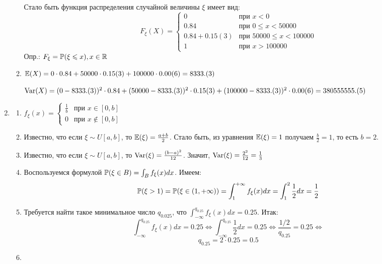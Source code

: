 \documentclass[12pt, a4paper]{article}\usepackage[]{graphicx}\usepackage[]{color}
\begin{document}
\begin{enumerate}
\begin{enumerate}
								Стало быть функция распределения случайной величины $\xi$ имеет вид:
								\[
								F_{\xi} (X) =
								\begin{cases}
								0 & \text{при } x<0 \\
								0.84 & \text{при } 0 \leq x < 50000 \\
								0.84 + 0.15(3) & \text{при } 50000
								\leq x < 100000 \\
								1 & \text{при } x > 100000
								\end{cases}
								\]
								Опр.: $F_{\xi} = \P (\xi \leq x ), x \in \mathbb{R}$
								\item $\E (X) = 0 \cdot 0.84 + 50000 \cdot 0.15(3) + 100000 \cdot 0.00(6) = 8333.(3)	$

								$\Var(X) = (0 - 8333.(3))^2 \cdot 0.84 + (50000-8333.(3))^2 \cdot 0.15(3) + (100000 - 8333.(3))^2 \cdot 0.00(6) = 380555555.(5)$
							\end{enumerate}
							\item
							\begin{enumerate}
								\item $ f_{\xi} (x)=
								\begin{cases}
								\frac{1}{b} & \text{при } x \in [0, b] \\
								0 & \text{при } x \notin [0, b]
								\end{cases}
								$
								\item  Известно, что если $\xi \sim U[a, b]$, то $\E (\xi) = \frac{a+b}{2}$. Стало быть, из уравнения $\E (\xi) = 1$ получаем $\frac{b}{2} = 1$,  то есть $b=2$.
								\item Известно, что если $\xi \sim U[a, b]$, то $\Var (\xi) = \frac{(b-a)^2}{12}$. Значит, $\Var (\xi) = \frac{2^2}{12} = \frac{1}{3}$
								\item Воспользуемся формулой $\P (\xi \in B ) = \int_B f_{\xi} (x) dx$. Имеем:
								\[
								\P (\xi > 1 ) = \P (\xi \in (1, + \infty) ) = \int_{1}^{+ \infty} f_{\xi} (x) dx = \int_{1}^{2} \frac{1}{2} dx = \frac{1}{2}
								\]
								\item Требуется найти такое минимальное число $q_{0.025}$, что $\int_{-\infty}^{q_{0.25}} f_{\xi} (x) dx = 0.25$. Итак:
								\[
								\int_{-\infty}^{q_{0.25}} f_{\xi} (x) dx = 0.25 \Leftrightarrow \int_{-\infty}^{q_{0.25}} \frac{1}{2} dx = 0.25 \Leftrightarrow \frac{1/2}{q_{0.25}} = 0.25 \Leftrightarrow
								\]
								\[
								q_{0.25} = 2 \cdot 0.25 = 0.5
								\]
								\item
								\begin{multline*}

\end{multline*}
\end{enumerate}
\end{enumerate}
\end{document}
